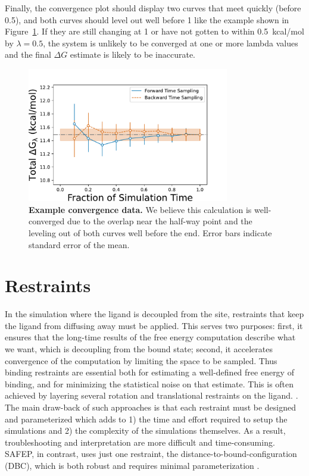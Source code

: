 \documentclass[9pt,tutorial]{Styling/livecoms}
\begin{document}
Finally, the convergence plot should display two curves that meet quickly (before 0.5), and both curves should level out well before 1 like the example shown in Figure~\ref{fig:convergenceExample}. If they are still changing at 1 or have not gotten to within 0.5~kcal/mol by $\lambda=0.5$, the system is unlikely to be converged at one or more lambda values and the final $\Delta G$ estimate is likely to be inaccurate.

\begin{figure}[htb]
    \centering
    \includegraphics[width=250pt]{good_convergence}
    \caption{\textbf{Example convergence data.} We believe this calculation is well-converged due to the overlap near the half-way point and the leveling out of both curves well before the end. Error bars indicate standard error of the mean.
    }\label{fig:convergenceExample}
\end{figure}

\section{Restraints}\label{app:restraints}
In the simulation where the ligand is decoupled from the site, restraints that keep the ligand from diffusing away must be applied. This serves two purposes:\cite{Hermans1986} first, it ensures that the long-time results of the free energy computation describe what we want, which is decoupling from the bound state; second, it accelerates convergence of the computation by limiting the space to be sampled.
Thus binding restraints are essential both for estimating a well-defined free energy of binding, and for minimizing the statistical noise on that estimate.
This is often achieved by layering several rotation and translational restraints on the ligand. \cite{Hermans1997, Gilson1997, Boresch2003, Hamelberg2004, Woo2005, Deng2006}.
The main draw-back of such approaches is that each restraint must be designed and parameterized which adds to 1) the time and effort required to setup the simulations and 2) the complexity of the simulations themselves.
As a result, troubleshooting and interpretation are more difficult and time-consuming.
SAFEP, in contrast, uses just one restraint, the distance-to-bound-configuration (DBC), which is both robust and requires minimal parameterization \cite{Salari2018}.
\end{document}
